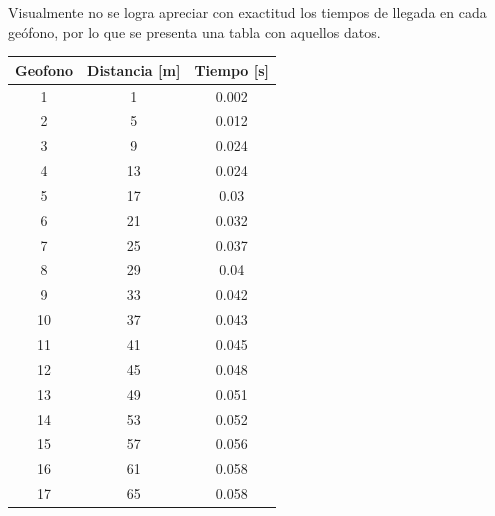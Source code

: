 \documentclass{article}
\theoremstyle{mytheoremstyle}
\theoremstyle{mytheoremstyle}
\theoremstyle{myproblemstyle}
\begin{document}
	\newpage
	Visualmente no se logra apreciar con exactitud los tiempos de llegada en cada geófono, por lo que se presenta una tabla con aquellos datos.
	\\%
	\begin{table}[h!]
		\centering
		\begin{tabular}{|c|c|c|}
		\hline
		\textbf{Geofono} & \textbf{Distancia {[}m{]}} & \textbf{Tiempo {[}s{]}} \\ \hline
		1                & 1                          & 0.002                   \\ \hline
		2                & 5                          & 0.012                   \\ \hline
		3                & 9                          & 0.024                   \\ \hline
		4                & 13                         & 0.024                   \\ \hline
		5                & 17                         & 0.03                    \\ \hline
		6                & 21                         & 0.032                   \\ \hline
		7                & 25                         & 0.037                   \\ \hline
		8                & 29                         & 0.04                    \\ \hline
		9                & 33                         & 0.042                   \\ \hline
		10               & 37                         & 0.043                   \\ \hline
		11               & 41                         & 0.045                   \\ \hline
		12               & 45                         & 0.048                   \\ \hline
		13               & 49                         & 0.051                   \\ \hline
		14               & 53                         & 0.052                   \\ \hline
		15               & 57                         & 0.056                   \\ \hline
		16               & 61                         & 0.058                   \\ \hline
		17               & 65                         & 0.058                   \\ \hline

\end{tabular}
\end{table}
\end{document}
